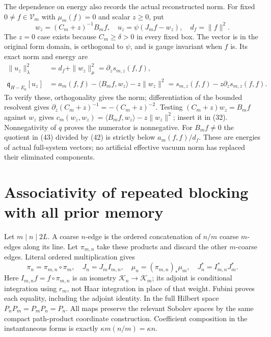 \documentclass[11pt]{article}
\newcommand{\KK}{\mathscr K}
\newcommand{\VV}{\mathscr V}
\begin{document}
The dependence on energy also records the actual reconstructed norm.
For fixed $0\ne f\in\VV_m$ with $\mu_m(f)=0$ and scalar $z\geq0$, put
\begin{equation}\label{eq:dressed}
 w_z=(C_m+z)^{-1}B_mf,\quad
 u_z=\psi(J_mf-w_z),\quad d_f=\|f\|^2.
\end{equation}
The $z=0$ case exists because $C_m\geq\delta>0$ in every fixed box.
The vector is in the original form domain, is orthogonal to $\psi$,
and is gauge invariant when $f$ is. Its exact norm and energy are
\begin{align}
 \|u_z\|_\lambda^2&=d_f+\|w_z\|_\mu^2
                  =\partial_z s_{m,z}(f,f),\label{eq:normderivative}\\
 \mathfrak q_{H-E_0}[u_z]
 &=a_m(f,f)-\langle B_mf,w_z\rangle-z\|w_z\|^2
   =s_{m,z}(f,f)-z\partial_zs_{m,z}(f,f).\label{eq:dressedenergy}
\end{align}
To verify these, orthogonality gives the norm; differentiation of the
bounded resolvent gives $\partial_z(C_m+z)^{-1}=-(C_m+z)^{-2}$.
Testing $(C_m+z)w_z=B_mf$ against $w_z$ gives
$c_m(w_z,w_z)=\langle B_mf,w_z\rangle-z\|w_z\|^2$; insert it in
(32). Nonnegativity of $q$ proves the numerator is nonnegative.
For $B_mf\ne0$ the quotient in (43) divided by
(42) is strictly below $a_m(f,f)/d_f$.
These are energies of actual full-system vectors; no artificial effective
vacuum norm has replaced their eliminated components.

\section{Associativity of repeated blocking with all prior memory}

Let $m\mid n\mid2L$. A coarse $n$-edge is the ordered concatenation of
$n/m$ coarse $m$-edges along its line. Let $\pi_{m,n}$ take these products
and discard the other $m$-coarse edges. Literal ordered multiplication gives
\begin{equation}\label{eq:tower}
 \pi_n=\pi_{m,n}\circ\pi_m,\quad J_n=J_m I_{m,n},\quad
 \mu_n=(\pi_{m,n})_*\mu_m,\quad
 J_n^*=I_{m,n}^*J_m^*.
\end{equation}
Here $I_{m,n}f=f\circ\pi_{m,n}$ is an isometry $\KK_n\to\KK_m$;
its adjoint is conditional integration using $r_m$, not Haar integration
in place of that weight. Fubini proves each equality, including the adjoint
identity. In the full Hilbert space $P_nP_m=P_mP_n=P_n$.
All maps preserve the relevant Sobolev spaces by the same compact
path-product coordinate construction. Coefficient composition in the
instantaneous forms is exactly $\kappa m(n/m)=\kappa n$.
\end{document}

